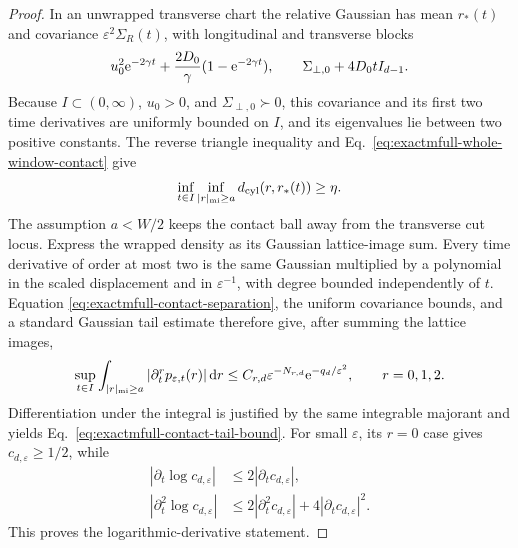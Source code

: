 \begin{proof}
In an unwrapped transverse chart the relative Gaussian has mean \(r_*(t)\)
and covariance \(\varepsilon^2\Sigma_R(t)\), with longitudinal and transverse
blocks
\begin{align}
 u_0^2\mathrm e^{-2\gamma t}
 +\frac{2D_0}{\gamma}(1-\mathrm e^{-2\gamma t}),
 \qquad
 \Sigma_{\perp,0}+4D_0t I_{d-1}.
 \label{eq:exactmfull-relative-covariance}
\end{align}
Because \(I\subset(0,\infty)\), \(u_0>0\), and
\(\Sigma_{\perp,0}\succ0\), this covariance and its first two time
derivatives are uniformly bounded on \(I\), and its eigenvalues lie between
two positive constants.  The reverse triangle inequality and
Eq.~\eqref{eq:exactmfull-whole-window-contact} give
\begin{equation}
 \inf_{t\in I}\inf_{|r|_{\rm mi}\ge a}
 d_{\rm cyl}(r,r_*(t))\ge\eta.
 \label{eq:exactmfull-contact-separation}
\end{equation}
The assumption \(a<W/2\) keeps the contact ball away from the transverse cut
locus.  Express the wrapped density as its Gaussian lattice-image sum.
Every time derivative of order at most two is the same Gaussian multiplied
by a polynomial in the scaled displacement and in \(\varepsilon^{-1}\),
with degree bounded independently of \(t\).  Equation
\eqref{eq:exactmfull-contact-separation}, the uniform covariance bounds, and
a standard Gaussian tail estimate therefore give, after summing the lattice
images,
\begin{equation}
 \sup_{t\in I}\int_{|r|_{\rm mi}\ge a}
 |\partial_t^r p_{\varepsilon,t}(r)|\,\mathrm d r
 \le C_{r,d}\varepsilon^{-N_{r,d}}
       \mathrm e^{-q_d/\varepsilon^2},
 \qquad r=0,1,2.
 \label{eq:exactmfull-density-tail}
\end{equation}
Differentiation under the integral is justified by the same integrable
majorant and yields Eq.~\eqref{eq:exactmfull-contact-tail-bound}.  For small
\(\varepsilon\), its \(r=0\) case gives \(c_{d,\varepsilon}\ge1/2\), while
\begin{align}
 |\partial_t\log c_{d,\varepsilon}|
 &\le2|\partial_t c_{d,\varepsilon}|,\nonumber\\
 |\partial_t^2\log c_{d,\varepsilon}|
 &\le2|\partial_t^2c_{d,\varepsilon}|
      +4|\partial_tc_{d,\varepsilon}|^2.
 \label{eq:exactmfull-log-contact-bounds}
\end{align}
This proves the logarithmic-derivative statement.
\end{proof}

